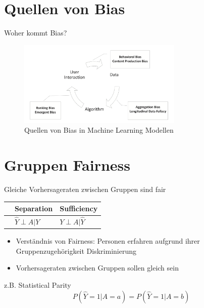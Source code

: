 \documentclass[aspectratio=169]{beamer}
\begin{document}
\section{Quellen von Bias}
\begin{frame}{Woher kommt Bias?}
	\begin{figure}
		\centering
		\includegraphics[width=0.7\textwidth]{../figures/bias_loop.png}
		\caption{Quellen von Bias in Machine Learning Modellen \cite{mehrabi2022}}
	\end{figure}
\end{frame}



\section{Gruppen Fairness}
\begin{frame}[t]{Gleiche Vorhersageraten zwischen Gruppen sind fair} %
    \vspace*{0.3cm} %
	\begin{table}
        \begin{tabular}{lll}
            \toprule
            \color{orange}{Independence} & Separation & Sufficiency \\
            \midrule
            \color{orange}{$\hat{Y} \perp A$} & $\hat{Y} \perp A | Y$ & $Y \perp A | \hat{Y}$\\
            \bottomrule
        \end{tabular}
    \end{table}
	\begin{itemize}
		\item Verständnis von Fairness: Personen erfahren aufgrund ihrer Gruppenzugehörigkeit Diskriminierung
		\item Vorhersageraten zwischen Gruppen sollen gleich sein
	\end{itemize}
	z.B. Statistical Parity \cite{verma2018} \\
	$$P(\hat{Y} = 1 | A = a) = P(\hat{Y} = 1 | A = b)$$
\end{frame}
\end{document}
